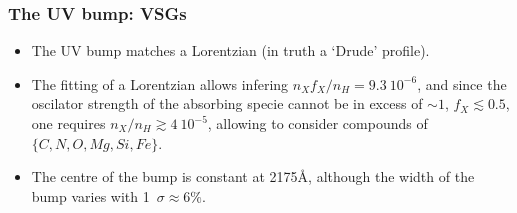 \begin{frame}\frametitle{The UV bump: VSGs}


\begin{minipage}[t]{0.59\textwidth}
\begin{itemize}
\item The UV bump matches a Lorentzian (in truth a `Drude' profile).
\item The fitting of a Lorentzian allows infering $n_X f_X/ n_H =
9.3~10^{-6}$, and since the oscilator strength of the absorbing specie
  cannot be in excess of $\sim 1$, $f_X \lesssim 0.5$, one requires
  $n_X/n_H \gtrsim 4~10^{-5}$, allowing to consider compounds of
  $\{C,N,O,Mg,Si,Fe\}$.
\item The centre of the bump is constant at  2175\AA,  although the
  width of the bump varies with 1~$\sigma \approx 6\%$.
\end{itemize}
\end{minipage}
\hfill
\begin{minipage}[t]{0.4\textwidth}
\vspace{-1cm}
  \begin{center}

\end{center}
\end{minipage}
\end{frame}
